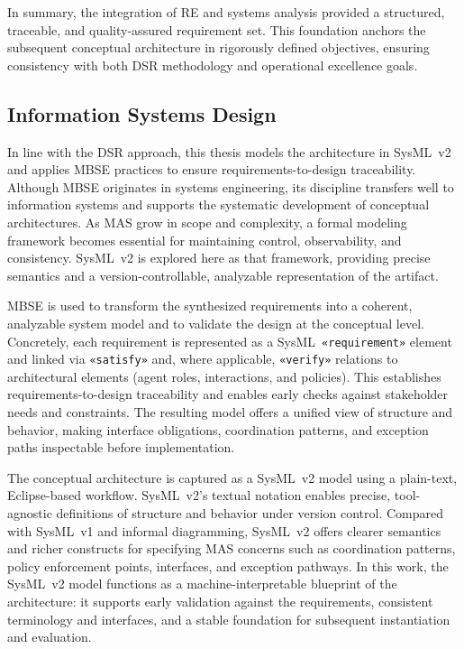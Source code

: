 In summary, the integration of RE and systems analysis provided a structured, traceable, and quality-assured requirement set. This foundation anchors the subsequent conceptual architecture in rigorously defined objectives, ensuring consistency with both DSR methodology and operational excellence goals.

\subsection{Information Systems Design}\label{subsec:isd}
In line with the DSR approach, this thesis models the architecture in SysML~v2 and applies MBSE practices to ensure requirements-to-design traceability. Although MBSE originates in systems engineering, its discipline transfers well to information systems and supports the systematic development of conceptual architectures. As MAS grow in scope and complexity, a formal modeling framework becomes essential for maintaining control, observability, and consistency. SysML~v2 is explored here as that framework, providing precise semantics and a version-controllable, analyzable representation of the artifact.

MBSE is used to transform the synthesized requirements into a coherent, analyzable system model and to validate the design at the conceptual level. Concretely, each requirement is represented as a SysML~\texttt{«requirement»} element and linked via \texttt{«satisfy»} and, where applicable, \texttt{«verify»} relations to architectural elements (agent roles, interactions, and policies). This establishes requirements-to-design traceability and enables early checks against stakeholder needs and constraints. The resulting model offers a unified view of structure and behavior, making interface obligations, coordination patterns, and exception paths inspectable before implementation.

The conceptual architecture is captured as a SysML~v2 model using a plain-text, Eclipse-based workflow. SysML~v2's textual notation enables precise, tool-agnostic definitions of structure and behavior under version control. Compared with SysML~v1 and informal diagramming, SysML~v2 offers clearer semantics and richer constructs for specifying MAS concerns such as coordination patterns, policy enforcement points, interfaces, and exception pathways. In this work, the SysML~v2 model functions as a machine-interpretable blueprint of the architecture: it supports early validation against the requirements, consistent terminology and interfaces, and a stable foundation for subsequent instantiation and evaluation.

